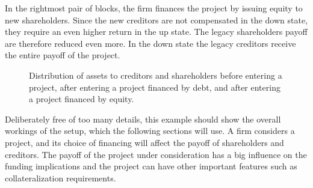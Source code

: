 \documentclass[main.tex]{subfiles}
\begin{document}
\begin{example}
    In the rightmost pair of blocks,
    the firm finances the project by issuing equity to new shareholders.
    Since the new creditors are not compensated in the down state,
    they require an even higher return in the up state.
    The legacy shareholders payoff are therefore reduced even more.
    In the down state the legacy creditors receive the entire payoff of the project.
    

    \end{example}

    \begin{figure}
        \centering
        \resizebox{\textwidth}{!}{%
        \begin{tikzpicture}
            
        \end{tikzpicture}        
        }   
        \caption{
            Distribution of assets to creditors and shareholders before entering a project,
            after entering a project financed by debt, 
            and after entering a project financed by equity.
        }
        \label{fig:funding-examples}
    \end{figure}

    Deliberately free of too many details, 
    this example should show the overall workings of the setup, 
    which the following sections will use.
    A firm considers a project, 
    and its choice of financing will affect the payoff of shareholders and creditors.
    The payoff of the project under consideration has a big influence on the funding implications
    and the project can have other important features such as collateralization requirements.
\end{document}
